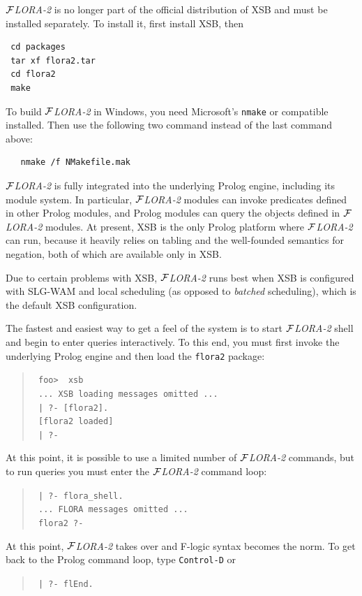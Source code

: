 \documentclass[11pt]{article}
\newcommand{\FLORA}{{\mbox{${\cal F}${\small\it LORA}\rm\emph{-2}}}\xspace}
\newcommand{\fl}{\mbox{F-logic}\xspace}
\begin{document}
\FLORA is no longer part of the official distribution of XSB and must be
installed separately.
To install it, first install XSB, then
\begin{verbatim}
 cd packages
 tar xf flora2.tar
 cd flora2
 make
\end{verbatim}
To build \FLORA in Windows, you need Microsoft's {\tt nmake} or
compatible installed. Then use the following two command instead of the
last command above:
\begin{verbatim}
   nmake /f NMakefile.mak
\end{verbatim}
\FLORA is fully integrated into the underlying Prolog engine, including its
module system. In particular, \FLORA modules can invoke predicates defined in
other Prolog modules, and Prolog modules can query the objects defined in
\FLORA modules. At present, XSB is the only Prolog platform where \FLORA
can run, because it heavily relies on tabling and the well-founded
semantics for negation, both of which are available only in XSB.

Due to certain problems with XSB, \FLORA runs best when XSB is configured
with SLG-WAM and local scheduling (as opposed to \emph{batched}
scheduling), which is the default XSB configuration.


The fastest and easiest way to get a feel of the system
is to start \FLORA shell and begin to enter queries interactively.  To
this end, you must first invoke the underlying Prolog engine and then load
the {\tt flora2} package:
\begin{quote}
  \tt
foo>~~xsb  \\
\tt
... XSB loading messages omitted ...\\
\tt
| ?- [flora2].\\
\tt
[flora2 loaded]\\
\tt
| ?-
\end{quote}
At this point, it is possible to use a limited number of \FLORA
commands, but to run queries you must enter the \FLORA command loop:
\begin{quote}
  \tt
| ?- flora\_shell.  \\
 \tt
... FLORA messages omitted ... \\
 \tt
flora2 ?-
\end{quote}

At this point, \FLORA takes over and \fl syntax becomes the
norm. To get back to the Prolog command loop, type {\tt Control-D} or 
\begin{quote}
  \tt
| ?- flEnd.  
\end{quote}
\end{document}
